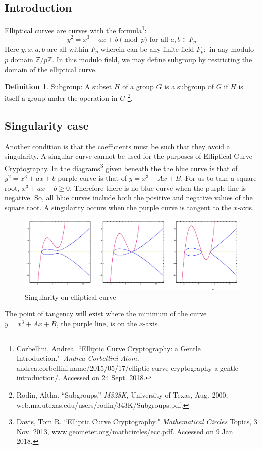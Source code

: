 \documentclass[a4paper,12pt]{article}
\theoremstyle{definition}
\newtheorem{definition}{Definition}
\begin{document}
\subsection{Introduction} \label{eccintro} 
Elliptical curves are curves with the formula\footnote{Corbellini, Andrea. ``Elliptic Curve Cryptography: a Gentle Introduction." \textit{Andrea Corbellini Atom,} andrea.corbellini.name/2015/05/17/elliptic-curve-cryptography-a-gentle-introduction/. Accessed on 24 Sept. 2018.}:
\begin{equation} \label{ellipticalcurve}
	y^2 =x^3 + ax + b  \pmod p \text{ for all } a,b \in F_p 
\end{equation}
Here $y,x,a,b$ are all within $F_p$ wherein can be any finite field $F_p:$ in any modulo $p$ domain $\mathbb{Z}/p\mathbb{Z}$. In this modulo field, we may define subgroup by restricting the domain of the elliptical curve. 
\begin{definition}{Subgroup: }
  A subset $H$ of a group $G$ is a subgroup of $G$ if $H$ is itself a group under the operation in $G$ \footnote{Rodin, Altha. “Subgroups.” \textit{M328K,} University of Texas, Aug. 2000, web.ma.utexas.edu/users/rodin/343K/Subgroups.pdf.}.     
\end{definition}



\subsection{Singularity case}
Another condition is that the coefficients must be such that they avoid a singularity. A singular curve cannot be used for the purposes of Elliptical Curve Cryptography. In the diagrams\footnote{Davis, Tom R. ``Elliptic Curve Cryptography." \textit{Mathematical Circles} Topics, 3 Nov. 2013, www.geometer.org/mathcircles/ecc.pdf. Accessed on 9 Jan. 2018.} given beneath the  the blue curve is that of $y^2 =x^3 +ax +b$ purple curve is that of $y=x^3 + Ax +B$. For us to take a square root, $x^3+ax+b \geq 0$. Therefore there is no blue curve when the purple line is negative. So, all blue curves include both the positive and negative values of the square root. A singularity occurs when the purple curve is tangent to the $x$-axis.
\begin{figure}[H]
	 \centering
     \includegraphics[width=\textwidth]{singularity}
     \caption{Singularity on elliptical curve}
     \label{}	
\end{figure}
The point of tangency will exist where the minimum of the curve $y=x^3 + Ax +B$, the purple line, is on the $x$-axis. 
\end{document}
